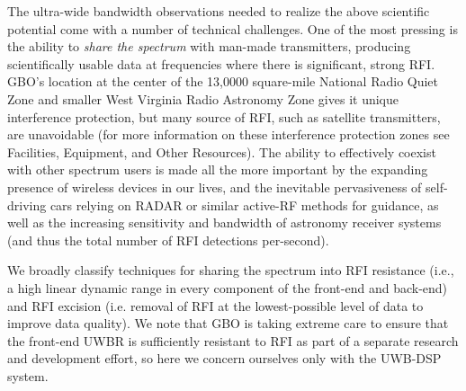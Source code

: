 \documentclass[10pt]{myNSF}
\begin{document}
\label{sec:technical_motivation}

The ultra-wide bandwidth observations needed to realize the above
scientific potential come with a number of technical challenges.  One
of the most pressing is the ability to \emph{share the spectrum} with
man-made transmitters, producing scientifically usable data at
frequencies where there is significant, strong RFI.  GBO's location at
the center of the 13,0000 square-mile National Radio Quiet Zone and
smaller West Virginia Radio Astronomy Zone gives it unique
interference protection, but many source of RFI, such as satellite
transmitters, are unavoidable (for more information on these
interference protection zones see Facilities, Equipment, and Other
Resources).  The ability to effectively coexist with other spectrum
users is made all the more important by the expanding presence of
wireless devices in our lives, and the inevitable pervasiveness of
self-driving cars relying on RADAR or similar active-RF methods for
guidance, as well as the increasing sensitivity and bandwidth of
astronomy receiver systems (and thus the total number of RFI
detections per-second).

We broadly classify techniques for sharing the spectrum into RFI
resistance (i.e., a high linear dynamic range in every component of
the front-end and back-end) and RFI excision (i.e. removal of RFI at
the lowest-possible level of data to improve data quality).  We note
that GBO is taking extreme care to ensure that the front-end UWBR is
sufficiently resistant to RFI as part of a separate research and
development effort, so here we concern ourselves only with the UWB-DSP
system.
\end{document}
